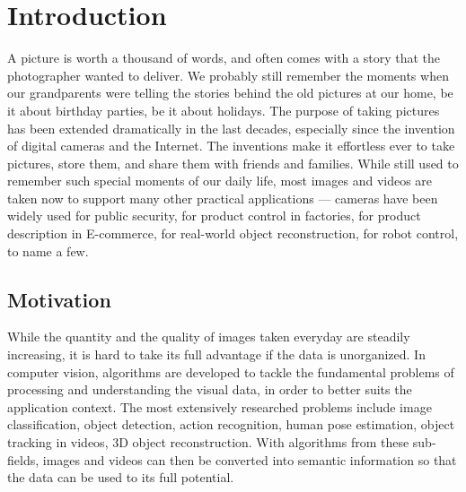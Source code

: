 \chapter{Introduction}

A picture is worth a thousand of words, and often comes with a story
that the photographer wanted to deliver. We probably still remember
the moments when our grandparents were telling the stories behind the
old pictures at our home, be it about birthday parties, be it about
holidays. The purpose of taking pictures has been extended
dramatically in the last decades, especially since the invention of
digital cameras and the Internet.  The inventions make it effortless ever to take pictures, store them, and share them with friends and
families.  While still used to
remember such special moments of our daily life,  most images and videos are taken now to support many other
practical applications --- cameras have been widely used for public security, for product control in factories, for
product description in E-commerce, for real-world object reconstruction, for robot control, to name a few. 

\section{Motivation}
While the quantity and the quality of images taken everyday are
steadily increasing, it is hard to take its full advantage if the data is unorganized. In computer vision,
algorithms are developed to tackle the fundamental
problems of processing and understanding the visual data, in order to  better suits the application context. The most extensively researched problems include image classification, object detection, action recognition, human pose estimation, object tracking in videos, 3D object reconstruction. With algorithms from these sub-fields, images and videos can then be
converted into semantic information so that the data can be used to
its full potential.


